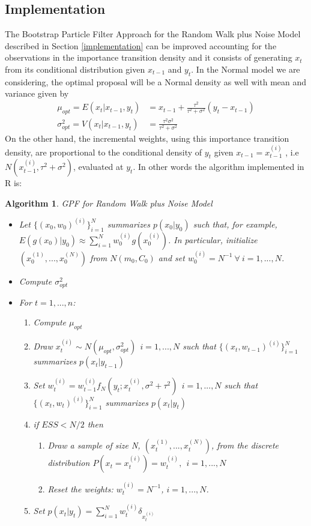 \documentclass[
]{book}
\theoremstyle{break}
\theoremstyle{nonumberplain}
\newtheorem{algorithm}{Algorithm}[section]
\begin{document}
\subsection{Implementation}

\hfill\break
The Bootstrap Particle Filter Approach for the Random Walk plus Noise
Model described in Section \ref{implementation} can be improved
accounting for the observations in the importance transition density and
it consists of generating \(x_{t}\) from its conditional distribution
given \(x_{t-1}\) and \(y_{t}\). In the Normal model we are considering,
the optimal proposal will be a Normal density as well with mean and
variance given by \begin{align*}
\mu_{opt}=E(x_{t}|x_{t-1},y_{t})&=x_{t-1}+\frac{\tau^{2}}{\tau^{2}+\sigma^{2}}(y_{t}-x_{t-1})\\
\sigma_{opt}^{2}=V(x_{t}|x_{t-1},y_{t})&=\frac{\tau^{2}\sigma^{2}}{\tau^{2}+\sigma^{2}}
\end{align*} On the other hand, the incremental weights, using this
importance transition density, are proportional to the conditional
density of \(y_{t}\) given \(x_{t-1}=x_{t-1}^{(i)}\) , i.e
\(N(x_{t-1}^{(i)},\tau^{2}+\sigma^{2})\), evaluated at \(y_{t}\). In
other words the algorithm implemented in R is:

\begin{algorithm} GPF for Random Walk plus Noise Model
\begin{itemize}
\item Let $\{(x_{0},w_{0})^{(i)}\}_{i=1}^{N}$ summarizes $p(x_{0}|y_{0})$ such that, for example, $E(g(x_{0})|y_{0}) \approx \sum_{i=1}^{N}w_{0}^{(i)}g(x_{0}^{(i)})$. In particular, initialize $(x_{0}^{(1)},...,x_{0}^{(N)})$ from $N(m_{0},C_{0})$ and set $w_{0}^{(i)}=N^{-1} \ \forall \ i=1,...,N$.
\item Compute $\sigma_{opt}^{2}$ 
\item For $t=1,...,n$:
\begin{enumerate}
\item Compute $\mu_{opt}$
\item Draw $x_{t}^{(i)} \sim N(\mu_{opt},\sigma_{opt}^{2}) \ \ i=1,...,N$ such that $\{(x_{t},w_{t-1})^{(i)}\}_{i=1}^{N}$ summarizes $p(x_{t}|y_{t-1})$
\item Set $w_{t}^{(i)} = w_{t-1}^{(i)}f_{N}(y_{t};x_{t}^{(i)},\sigma^2+\tau^{2}) \ \ i=1,...,N$ such that $\{(x_{t},w_{t})^{(i)}\}_{i=1}^{N}$ summarizes $p(x_{t}|y_{t})$
\item if $ESS<N/2$ then
\begin{enumerate}
\item Draw a sample of size N, $(x_{t}^{(1)},...,x_{t}^{(N)})$, from the discrete distribution $P(x_{t}=x_{t}^{(i)})=w_{t}^{(i)},\ \ i=1,...,N$
\item Reset the weights: $w_{t}^{(i)}=N^{-1}$, $i=1,...,N$.
\end{enumerate}
\item Set $p(x_{t}|y_{t})=\sum_{i=1}^{N}w_{t}^{(i)}\delta_{x_{t}^{(i)}}$
\end{enumerate}
\end{itemize}
\end{algorithm}
\end{document}
